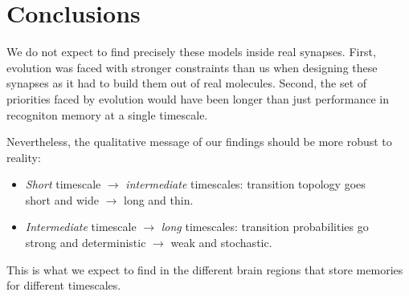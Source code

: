 \documentclass[12pt]{article}
\begin{document}
\section{Conclusions}\label{sec:conclusions}


We do not expect to find precisely these models inside real synapses.
First, evolution was faced with stronger constraints than us when designing these synapses as it had to build them out of real molecules.
Second, the set of priorities faced by evolution would have been longer than just performance in recogniton memory at a single timescale.

Nevertheless, the qualitative message of our findings should be more robust to reality:
%
\begin{itemize}
  \item \emph{Short} timescale $\to$ \emph{intermediate} timescales: transition topology goes \\ short and wide $\to$ long and thin.
  \item \emph{Intermediate} timescale $\to$ \emph{long} timescales: transition probabilities go \\ strong and deterministic $\to$ weak and stochastic.
\end{itemize}
%
This is what we expect to find in the different brain regions that store memories for different timescales.














\end{document}
